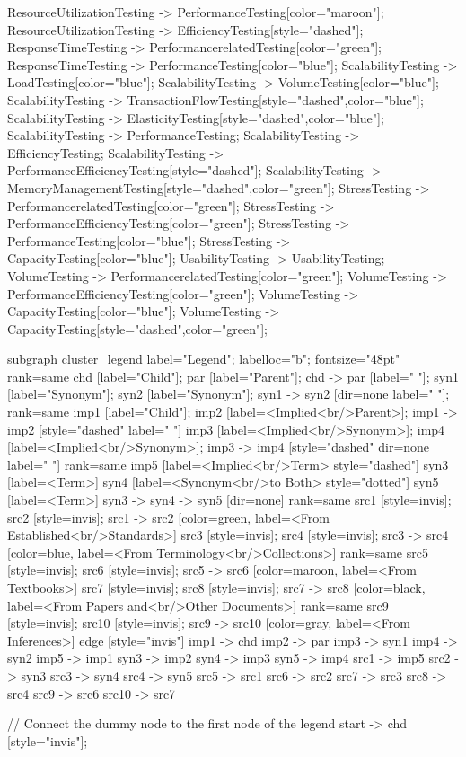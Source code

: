 \documentclass{article}
\begin{document}
{ResourceUtilizationTesting -> PerformanceTesting[color="maroon"];
ResourceUtilizationTesting -> EfficiencyTesting[style="dashed"];
ResponseTimeTesting -> PerformancerelatedTesting[color="green"];
ResponseTimeTesting -> PerformanceTesting[color="blue"];
ScalabilityTesting -> LoadTesting[color="blue"];
ScalabilityTesting -> VolumeTesting[color="blue"];
ScalabilityTesting -> TransactionFlowTesting[style="dashed",color="blue"];
ScalabilityTesting -> ElasticityTesting[style="dashed",color="blue"];
ScalabilityTesting -> PerformanceTesting;
ScalabilityTesting -> EfficiencyTesting;
ScalabilityTesting -> PerformanceEfficiencyTesting[style="dashed"];
ScalabilityTesting -> MemoryManagementTesting[style="dashed",color="green"];
StressTesting -> PerformancerelatedTesting[color="green"];
StressTesting -> PerformanceEfficiencyTesting[color="green"];
StressTesting -> PerformanceTesting[color="blue"];
StressTesting -> CapacityTesting[color="blue"];
UsabilityTesting -> UsabilityTesting;
VolumeTesting -> PerformancerelatedTesting[color="green"];
VolumeTesting -> PerformanceEfficiencyTesting[color="green"];
VolumeTesting -> CapacityTesting[color="blue"];
VolumeTesting -> CapacityTesting[style="dashed",color="green"];

subgraph cluster_legend {
    label="Legend";
    labelloc="b";
    fontsize="48pt"
    {
        rank=same
        chd [label="Child"];
        par [label="Parent"];
        chd -> par [label="                "];
        syn1 [label="Synonym"];
        syn2 [label="Synonym"];
        syn1 -> syn2 [dir=none label="                "];
    }
    {
        rank=same
        imp1 [label="Child"];
        imp2 [label=<Implied<br/>Parent>];
        imp1 -> imp2 [style="dashed" label="                "]
        imp3 [label=<Implied<br/>Synonym>];
        imp4 [label=<Implied<br/>Synonym>];
        imp3 -> imp4 [style="dashed" dir=none label="                "]
    }
    {
        rank=same
        imp5 [label=<Implied<br/>Term> style="dashed"]
        syn3 [label=<Term>]
        syn4 [label=<Synonym<br/>to Both> style="dotted"]
        syn5 [label=<Term>]
        syn3 -> syn4 -> syn5 [dir=none]
    }
{
rank=same
src1 [style=invis];
src2 [style=invis];
src1 -> src2 [color=green, label=<From Established<br/>Standards>]
src3 [style=invis];
src4 [style=invis];
src3 -> src4 [color=blue, label=<From Terminology<br/>Collections>]
}
{
rank=same
src5 [style=invis];
src6 [style=invis];
src5 -> src6 [color=maroon, label=<From Textbooks>]
src7 [style=invis];
src8 [style=invis];
src7 -> src8 [color=black, label=<From Papers and<br/>Other Documents>]
}
{
rank=same
src9 [style=invis];
src10 [style=invis];
src9 -> src10 [color=gray, label=<From Inferences>]
}
    edge [style="invis"]
    imp1 -> chd
    imp2 -> par
    imp3 -> syn1
    imp4 -> syn2
imp5 -> imp1
syn3 -> imp2
syn4 -> imp3
syn5 -> imp4
src1 -> imp5
src2 -> syn3
src3 -> syn4
src4 -> syn5
src5 -> src1
src6 -> src2
src7 -> src3
src8 -> src4
src9 -> src6
src10 -> src7
}

// Connect the dummy node to the first node of the legend
start -> chd [style="invis"];
}
\end{document}
